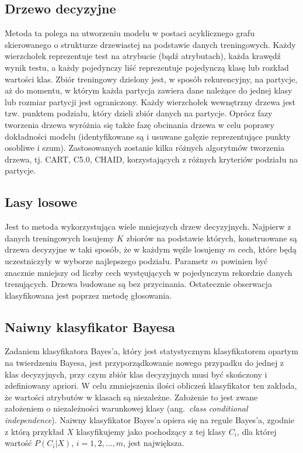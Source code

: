 \documentclass{article}
\newcommand{\ang}[1]{ang.~{\itshape #1}}
\begin{document}
\subsection{Drzewo decyzyjne}
Metoda ta polega na utworzeniu modelu w postaci acyklicznego grafu skierowanego o strukturze drzewiastej na podstawie danych treningowych. Każdy wierzchołek reprezentuje test na atrybucie (bądź atrybutach), każda krawędź wynik testu, a każdy pojedynczy liść reprezentuje pojedynczą klasę lub rozkład wartości klas. Zbiór treningowy dzielony jest, w sposób rekurencyjny, na partycje, aż do momentu, w którym każda partycja zawiera dane należące do jednej klasy lub rozmiar partycji jest ograniczony. Każdy wierzchołek wewnętrzny drzewa jest tzw. punktem podziału, który dzieli zbiór danych na partycje. Oprócz fazy tworzenia drzewa wyróżnia się także fazę obcinania drzewa w celu poprawy dokładności modelu (identyfikowane są i usuwane gałęzie reprezentujące punkty osobliwe i szum). Zastosowanych zostanie kilka różnych algorytmów tworzenia drzewa, tj. CART, C5.0, CHAID, korzystających z różnych kryteriów podziału na partycje.

\subsection{Lasy losowe}
Jest to metoda wykorzystująca wiele mniejszych drzew decyzyjnych. Najpierw z danych treningowych losujemy $K$ zbiorów na podstawie których, konstruowane są drzewa decyzyjne w taki sposób, że w każdym węźle losujemy $m$ cech, które będą uczestniczyły w wyborze najlepszego podziału. Parametr $m$ powinien być znacznie mniejszy od liczby cech wystęujących w pojedynczym rekordzie danych trenujących. Drzewa budowane są bez przycinania. Ostatecznie
obserwacja klasyfikowana jest poprzez metodę głosowania.

\subsection{Naiwny klasyfikator Bayesa}

Zadaniem klasyfikatora Bayes’a, który jest statystycznym klasyfikatorem opartym na twierdzeniu Bayesa, jest przyporządkowanie nowego przypadku do jednej z klas decyzyjnych, przy czym zbiór klas decyzyjnych musi być skończony i zdefiniowany apriori. W celu zmniejszenia ilości obliczeń klasyfikator ten zakłada, że wartości atrybutów w klasach są niezależne. Założenie to jest zwane założeniem o niezależności warunkowej klasy (\ang{class conditional independence}). Naiwny klasyfikator Bayes’a opiera się na regule Bayes’a, zgodnie z którą przykład $X$ klasyfikujemy jako pochodzący z tej klasy $C_{i}$, dla której wartość $P(C_{i}|X)$, $i = 1, 2, ..., m$, jest największa.
\end{document}
